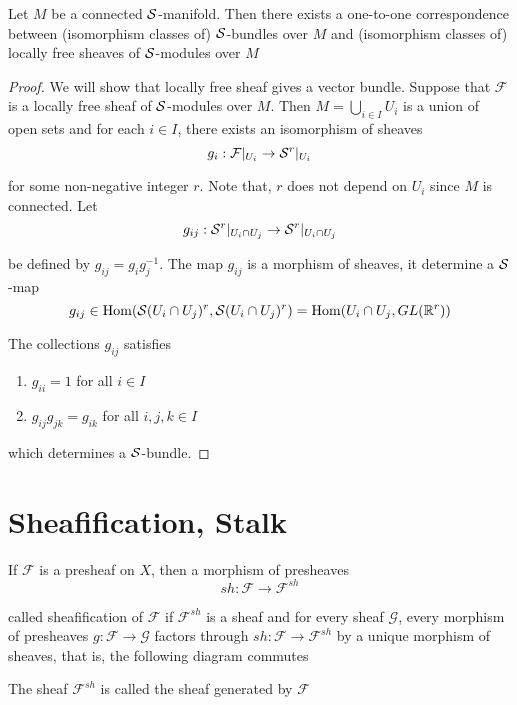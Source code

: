 \begin{theorem}
	Let $M$ be a connected $\mathcal{S}$-manifold. Then there exists a one-to-one correspondence between (isomorphism classes of) $\mathcal{S}$-bundles over $M$ and (isomorphism classes of) locally free sheaves of $\mathcal{S}$-modules over $M$
	\begin{proof}
		We will show that locally free sheaf gives a vector bundle. Suppose that $\mathcal{F}$ is a locally free sheaf of $\mathcal{S}$-modules over $M$. Then $M = \bigcup_{i \in I} U_i$ is a union of open sets and for each $i \in I$, there exists an isomorphism of sheaves
		$$
			g_i: \mathcal{F}\vert_{U_i} \to \mathcal{S}^r\vert_{U_i}
		$$
		
		for some non-negative integer $r$. Note that, $r$ does not depend on $U_i$ since $M$ is connected. Let 
		$$
			g_{ij}: \mathcal{S}^r\vert_{U_i \cap U_j} \to \mathcal{S}^r\vert_{U_i \cap U_j}
		$$
		
		be defined by $g_{ij} = g_i g_j^{-1}$. The map $g_{ij}$ is a morphism of sheaves, it determine a $\mathcal{S}$-map
		$$
			g_{ij} \in \operatorname{Hom}(\mathcal{S}(U_i \cap U_j)^r, \mathcal{S}(U_i \cap U_j)^r) = \operatorname{Hom}(U_i \cap U_j, GL(\mathbb{R}^r))
		$$
		
		The collections $g_{ij}$ satisfies 
		\begin{enumerate}
			\item $g_{ii} = 1$ for all $i \in I$
			\item $g_{ij} g_{jk} = g_{ik}$ for all $i, j, k \in I$
		\end{enumerate}
		
		which determines a $\mathcal{S}$-bundle.
		
	\end{proof}
\end{theorem}

\section{Sheafification, Stalk}

\begin{definition}[sheafification]
	If $\mathcal{F}$ is a presheaf on $X$, then a morphism of presheaves
	$$
	sh: \mathcal{F} \to \mathcal{F}^{sh}
	$$
	
	called sheafification of $\mathcal{F}$ if $\mathcal{F}^{sh}$ is a sheaf and for every sheaf $\mathcal{G}$, every morphism of presheaves $g: \mathcal{F} \to \mathcal{G}$ factors through $sh: \mathcal{F} \to \mathcal{F}^{sh}$ by a unique morphism of sheaves, that is, the following diagram commutes
	\begin{center}
	\end{center}
	
	The sheaf $\mathcal{F}^{sh}$ is called the sheaf generated by $\mathcal{F}$
\end{definition}

